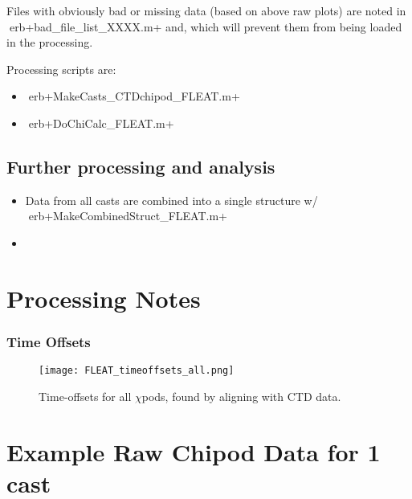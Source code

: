 \documentclass[11pt]{article}
\begin{document}
Files with obviously bad or missing data (based on above raw plots) are noted in erb+bad_file_list_XXXX.m+ and, which will prevent them from being loaded in the processing. 

Processing scripts are: 
\begin{itemize} 
\item erb+MakeCasts_CTDchipod_FLEAT.m+ 
\item erb+DoChiCalc_FLEAT.m+ 
\end{itemize} 

\subsection{Further processing and analysis} 

\begin{itemize} 
\item Data from all casts are combined into a single structure w/ erb+MakeCombinedStruct_FLEAT.m+ 
\item  
\end{itemize} 

\newpage 

\section{Processing Notes} 





\subsubsection{Time Offsets} 

\begin{figure}[htbp] 

\texttt{[image: FLEAT\_timeoffsets\_all.png]} 
\caption{Time-offsets for all $\chi$pods, found by aligning with CTD data.} 
\label{toffs} 
\end{figure} 

\newpage 

\section{Example Raw Chipod Data for 1 cast} 
\end{document}

